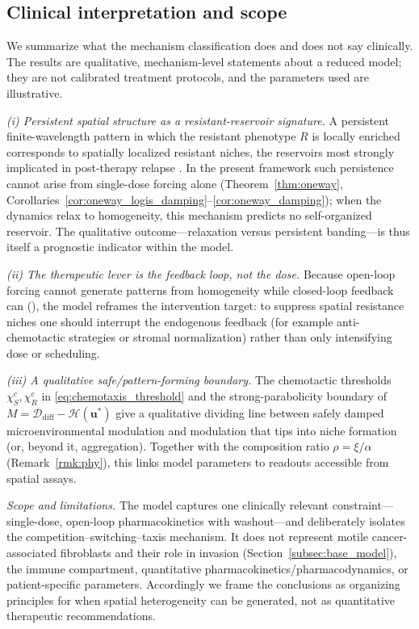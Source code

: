 \documentclass[pdflatex,sn-mathphys-ay]{sn-jnl}
\theoremstyle{thmstyleone}
\theoremstyle{definition}
\theoremstyle{remark}
\begin{document}
\subsection{Clinical interpretation and scope}
\label{subsec:clinical_interpretation}
We summarize what the mechanism classification does and does not say clinically.
The results are qualitative, mechanism-level statements about a reduced model;
they are not calibrated treatment protocols, and the parameters used are
illustrative.

\emph{(i) Persistent spatial structure as a resistant-reservoir signature.}
A persistent finite-wavelength pattern in which the resistant phenotype $R$ is
locally enriched corresponds to spatially localized resistant niches, the
reservoirs most strongly implicated in post-therapy relapse \citep{liu2025bidirectional}. In the present
framework such persistence cannot arise from single-dose forcing alone
(Theorem~\ref{thm:oneway}, Corollaries~\ref{cor:oneway_logis_damping}--\ref{cor:oneway_damping}); when the dynamics relax to
homogeneity, this mechanism predicts no self-organized reservoir. The
qualitative outcome---relaxation versus persistent banding---is thus itself a
prognostic indicator within the model.

\emph{(ii) The therapeutic lever is the feedback loop, not the dose.}
Because open-loop forcing cannot generate patterns from homogeneity while
closed-loop feedback can (), the model reframes
the intervention target: to suppress spatial resistance niches one should
interrupt the endogenous feedback (for example anti-chemotactic strategies or
stromal normalization) rather than only intensifying dose or scheduling.

\emph{(iii) A qualitative safe/pattern-forming boundary.}
The chemotactic thresholds $\chi_S^{c},\chi_R^{c}$ in
\eqref{eq:chemotaxis_threshold} and the strong-parabolicity boundary of
$M=\mathcal D_{\mathrm{diff}}-\mathcal H(\mathbf u^*)$ give a qualitative dividing
line between safely damped microenvironmental modulation and modulation that
tips into niche formation (or, beyond it, aggregation). Together with the
composition ratio $\rho=\xi/\alpha$ (Remark~\ref{rmk:phy}), this links model
parameters to readouts accessible from spatial assays.

\emph{Scope and limitations.} The model captures one clinically relevant
constraint---single-dose, open-loop pharmacokinetics with washout---and
deliberately isolates the competition--switching--taxis mechanism. It does not
represent motile cancer-associated fibroblasts and their role in invasion
(Section~\ref{subsec:base_model}), the immune compartment, quantitative
pharmacokinetics/pharmacodynamics, or patient-specific parameters. Accordingly
we frame the conclusions as organizing principles for when spatial heterogeneity
can be generated, not as quantitative therapeutic recommendations.
\end{document}
